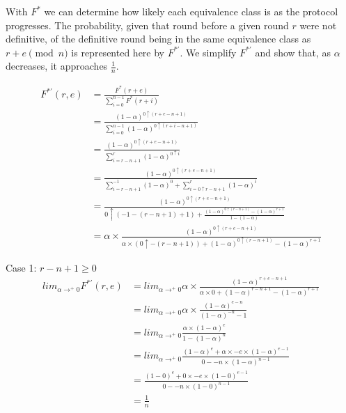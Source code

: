 \documentclass[12pt]{dalcsthesis}
\begin{document}
With $F^{*}$ we can determine how likely each equivalence class is as the protocol progresses. The probability, given that round before a given round $r$ were not definitive, of the definitive round being in the same equivalence class as $r+e \pmod{n}$ is represented here by $F^{*'}$. We simplify $F^{*'}$ and show that, as $\alpha$ decreases, it approaches $\frac{1}{n}$.

\begin{align*}
F^{*'}(r, e)
  &= \frac{F^{*}(r+e)}{\sum_{i=0}^{n-1} F^{*}(r+i)}
\\&= \frac{(1-\alpha)^{0 \uparrow (r + e - n + 1)}}{\sum_{i=0}^{n-1} (1-\alpha)^{0 \uparrow (r + i - n + 1)}}
\\&= \frac{(1-\alpha)^{0 \uparrow (r + e - n + 1)}}{\sum_{i=r-n+1}^{r} (1-\alpha)^{0 \uparrow i}}
\\&= \frac{(1-\alpha)^{0 \uparrow (r + e - n + 1)}}{\sum_{i=r-n+1}^{-1} (1-\alpha)^0 + \sum_{i=0 \uparrow {r-n+1}}^{r} (1-\alpha)^i}
\\&= \frac{(1-\alpha)^{0 \uparrow (r + e - n + 1)}}{0 \uparrow (-1 -(r-n+1) + 1) + \frac{(1-\alpha)^{0 \uparrow (r-n+1)} - (1-\alpha)^{r+1}}{1-(1-\alpha)}}
\\&= \alpha \times \frac{(1-\alpha)^{0 \uparrow (r + e - n + 1)}}{\alpha \times (0 \uparrow -(r-n+1)) + (1-\alpha)^{0 \uparrow (r-n+1)} - (1-\alpha)^{r+1}}
\end{align*}

Case 1: $r-n+1 \geq 0$ 
\begin{align*}
lim_{\alpha \rightarrow^{+} 0} F^{*'}(r, e)
  &= lim_{\alpha \rightarrow^{+} 0} \alpha \times \frac{(1-\alpha)^{r + e - n + 1}}{\alpha \times 0 + (1-\alpha)^{r-n+1} - (1-\alpha)^{r+1}}
\\&= lim_{\alpha \rightarrow^{+} 0} \alpha \times \frac{(1-\alpha)^{e - n}}{(1-\alpha)^{-n} - 1}
\\&= lim_{\alpha \rightarrow^{+} 0} \frac{\alpha \times (1-\alpha)^e}{1 - (1-\alpha)^n}
\\&= lim_{\alpha \rightarrow^{+} 0} \frac{(1-\alpha)^e + \alpha \times -e \times (1-\alpha)^{e-1}}{0 - -n \times (1-\alpha)^{n-1}}
\\&= \frac{(1-0)^e + 0 \times -e \times (1-0)^{e-1}}{0 - -n \times (1-0)^{n-1}}
\\&= \frac{1}{n}
\end{align*} 
\end{document}
